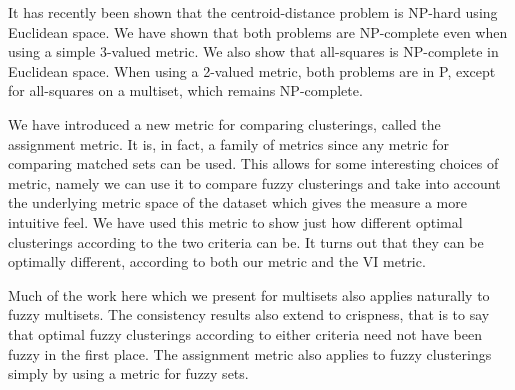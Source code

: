 It has recently been shown that the centroid-distance problem is NP-hard using
Euclidean space.  We have shown that both problems are NP-complete even when
using a simple 3-valued metric.  We also show that all-squares is NP-complete
in Euclidean space.  When using a 2-valued metric, both problems are in P,
except for all-squares on a multiset, which remains NP-complete.

We have introduced a new metric for comparing clusterings, called the
assignment metric.  It is, in fact, a family of metrics since any metric for
comparing matched sets can be used.  This allows for some interesting choices
of metric, namely we can use it to compare fuzzy clusterings and take into
account the underlying metric space of the dataset which gives the measure a
more intuitive feel.  We have used this metric to show just how different
optimal clusterings according to the two criteria can be.  It turns out that
they can be optimally different, according to both our metric and the VI
metric.

Much of the work here which we present for multisets also applies naturally to
fuzzy multisets.  The consistency results also extend to crispness, that is to
say that optimal fuzzy clusterings according to either criteria need not have
been fuzzy in the first place.  The assignment metric also applies to fuzzy
clusterings simply by using a metric for fuzzy sets.




